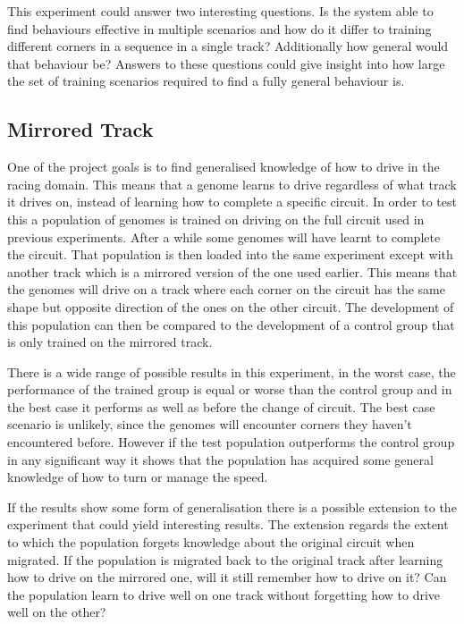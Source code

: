 This experiment could answer two interesting questions. Is the system able to find behaviours effective in multiple scenarios and how do it differ to training different corners in a sequence in a single track? Additionally how general would that behaviour be? Answers to these questions could give insight into how large the set of training scenarios required to find a fully general behaviour is. 


\subsection{Mirrored Track}
One of the project goals is to find generalised knowledge of how to drive in the racing domain. This means that a genome learns to drive regardless of what track it drives on, instead of learning how to complete a specific circuit. In order to test this a population of genomes is trained on driving on the full circuit used in previous experiments. After a while some genomes will have learnt to complete the circuit. That population is then loaded into the same experiment except with another track which is a mirrored version of the one used earlier. This means that the genomes will drive on a track where each corner on the circuit has the same shape but opposite direction of the ones on the other circuit. The development of this population can then be compared to the development of a control group that is only trained on the mirrored track. 


There is a wide range of possible results in this experiment, in the worst case, the performance of the trained group is equal or worse than the control group and in the best case it performs as well as before the change of circuit. The best case scenario is unlikely, since the genomes will encounter corners they haven't encountered before. However if the test population outperforms the control group in any significant way it shows that the population has acquired some general knowledge of how to turn or manage the speed. 

If the results show some form of generalisation there is a possible extension to the experiment that could yield interesting results. The extension regards the extent to which the population forgets knowledge about the original circuit when migrated. If the population is migrated back to the original track after learning how to drive on the mirrored one, will it still remember how to drive on it? Can the population learn to drive well on one track without forgetting how to drive well on the other?
